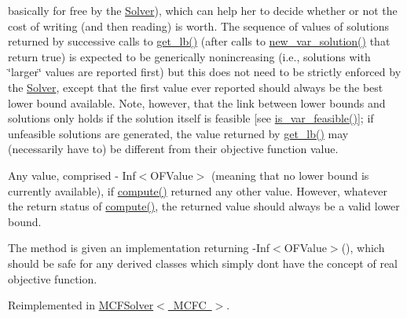 \begin{DoxyItemize}
basically for free by the \mbox{\hyperlink{class_s_m_spp__di__unipi__it_1_1_solver}{Solver}}), which can help her to decide whether or not the cost of writing (and then reading) is worth. The sequence of values of solutions returned by successive calls to \mbox{\hyperlink{class_s_m_spp__di__unipi__it_1_1_solver_a4a4dbe4c2416d531c4619ca94fc07d31}{get\+\_\+lb()}} (after calls to \mbox{\hyperlink{class_s_m_spp__di__unipi__it_1_1_solver_af109b504a566c90a4ea45c1574c128fe}{new\+\_\+var\+\_\+solution()}} that return true) is expected to be generically nonincreasing (i.\+e., solutions with \char`\"{}larger\char`\"{} values are reported first) but this does not need to be strictly enforced by the \mbox{\hyperlink{class_s_m_spp__di__unipi__it_1_1_solver}{Solver}}, except that the first value ever reported should always be the best lower bound available. Note, however, that the link between lower bounds and solutions only holds if the solution itself is feasible \mbox{[}see \mbox{\hyperlink{class_s_m_spp__di__unipi__it_1_1_solver_a038fa1e554e91724e1ce3f593aba55fd}{is\+\_\+var\+\_\+feasible()}}\mbox{]}; if unfeasible solutions are generated, the value returned by \mbox{\hyperlink{class_s_m_spp__di__unipi__it_1_1_solver_a4a4dbe4c2416d531c4619ca94fc07d31}{get\+\_\+lb()}} may (necessarily have to) be different from their objective function value.
\item Any value, comprised -\/ Inf$<$\+O\+F\+Value$>$ (meaning that no lower bound is currently available), if \mbox{\hyperlink{class_s_m_spp__di__unipi__it_1_1_solver_a504d4e3e174c7a518cc66156a8a45ce5}{compute()}} returned any other value. However, whatever the return status of \mbox{\hyperlink{class_s_m_spp__di__unipi__it_1_1_solver_a504d4e3e174c7a518cc66156a8a45ce5}{compute()}}, the returned value should always be a valid lower bound.
\end{DoxyItemize}

The method is given an implementation returning -\/\+Inf$<$\+O\+F\+Value$>$(), which should be safe for any derived classes which simply don\textquotesingle{}t have the concept of real objective function. 

Reimplemented in \mbox{\hyperlink{class_s_m_spp__di__unipi__it_1_1_m_c_f_solver_a064e49220c7f623cd53edbee8313c753}{M\+C\+F\+Solver$<$ M\+C\+F\+C $>$}}.

\mbox{\label{class_s_m_spp__di__unipi__it_1_1_solver_a842fd454acaded84baf6b77e0d61a950}} 
